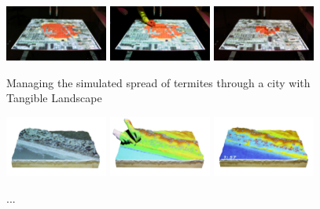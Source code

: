\documentclass[prodmode,acmtochi]{acmsmall} %
\begin{document}
\begin{figure}[ht!]
\begin{center}
		\includegraphics[width=0.3\textwidth]{images/termite_game_1.jpg}
		\includegraphics[width=0.3\textwidth]{images/termite_game_2.jpg}
		\includegraphics[width=0.3\textwidth]{images/termite_game_3.jpg}
	\caption{Managing the simulated spread of termites through a city with Tangible Landscape}
	\label{fig:termite_game}
\end{center}
\end{figure}

\begin{figure}[ht!]
\begin{center}
		\includegraphics[width=0.3\textwidth]{images/tl_coastal_1s.png}
		\includegraphics[width=0.3\textwidth]{images/tl_coastal_3s.png}
		\includegraphics[width=0.3\textwidth]{images/tl_coastal_4s.png}
	\caption{...}
	\label{fig:coastal_game}
\end{center}
\end{figure}
\end{document}
